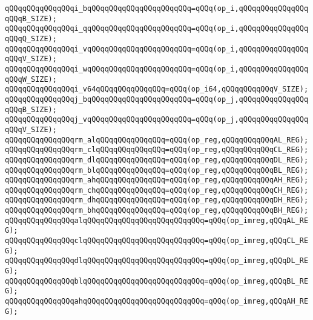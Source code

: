 \verb|qQQqqQQqqQQqqQQqi_bqQQqqQQqqQQqqQQqqQQqqQQq=qQQq(op_i,qQQqqQQqqQQqqQQqqQQqB_SIZE);|\newline
\verb|qQQqqQQqqQQqqQQqi_qqQQqqQQqqQQqqQQqqQQqqQQq=qQQq(op_i,qQQqqQQqqQQqqQQqqQQqQ_SIZE);|\newline
\verb|qQQqqQQqqQQqqQQqi_vqQQqqQQqqQQqqQQqqQQqqQQq=qQQq(op_i,qQQqqQQqqQQqqQQqqQQqV_SIZE);|\newline
\verb|qQQqqQQqqQQqqQQqi_wqQQqqQQqqQQqqQQqqQQqqQQq=qQQq(op_i,qQQqqQQqqQQqqQQqqQQqW_SIZE);|\newline
\verb|qQQqqQQqqQQqqQQqi_v64qQQqqQQqqQQqqQQq=qQQq(op_i64,qQQqqQQqqQQqV_SIZE);|\newline
\verb|qQQqqQQqqQQqqQQqj_bqQQqqQQqqQQqqQQqqQQqqQQq=qQQq(op_j,qQQqqQQqqQQqqQQqqQQqB_SIZE);|\newline
\verb|qQQqqQQqqQQqqQQqj_vqQQqqQQqqQQqqQQqqQQqqQQq=qQQq(op_j,qQQqqQQqqQQqqQQqqQQqV_SIZE);|\newline
\verb|qQQqqQQqqQQqqQQqrm_alqQQqqQQqqQQqqQQq=qQQq(op_reg,qQQqqQQqqQQqAL_REG);|\newline
\verb|qQQqqQQqqQQqqQQqrm_clqQQqqQQqqQQqqQQq=qQQq(op_reg,qQQqqQQqqQQqCL_REG);|\newline
\verb|qQQqqQQqqQQqqQQqrm_dlqQQqqQQqqQQqqQQq=qQQq(op_reg,qQQqqQQqqQQqDL_REG);|\newline
\verb|qQQqqQQqqQQqqQQqrm_blqQQqqQQqqQQqqQQq=qQQq(op_reg,qQQqqQQqqQQqBL_REG);|\newline
\verb|qQQqqQQqqQQqqQQqrm_ahqQQqqQQqqQQqqQQq=qQQq(op_reg,qQQqqQQqqQQqAH_REG);|\newline
\verb|qQQqqQQqqQQqqQQqrm_chqQQqqQQqqQQqqQQq=qQQq(op_reg,qQQqqQQqqQQqCH_REG);|\newline
\verb|qQQqqQQqqQQqqQQqrm_dhqQQqqQQqqQQqqQQq=qQQq(op_reg,qQQqqQQqqQQqDH_REG);|\newline
\verb|qQQqqQQqqQQqqQQqrm_bhqQQqqQQqqQQqqQQq=qQQq(op_reg,qQQqqQQqqQQqBH_REG);|\newline
\verb|qQQqqQQqqQQqqQQqalqQQqqQQqqQQqqQQqqQQqqQQqqQQq=qQQq(op_imreg,qQQqAL_REG);|\newline
\verb|qQQqqQQqqQQqqQQqclqQQqqQQqqQQqqQQqqQQqqQQqqQQq=qQQq(op_imreg,qQQqCL_REG);|\newline
\verb|qQQqqQQqqQQqqQQqdlqQQqqQQqqQQqqQQqqQQqqQQqqQQq=qQQq(op_imreg,qQQqDL_REG);|\newline
\verb|qQQqqQQqqQQqqQQqblqQQqqQQqqQQqqQQqqQQqqQQqqQQq=qQQq(op_imreg,qQQqBL_REG);|\newline
\verb|qQQqqQQqqQQqqQQqahqQQqqQQqqQQqqQQqqQQqqQQqqQQq=qQQq(op_imreg,qQQqAH_REG);|\newline
